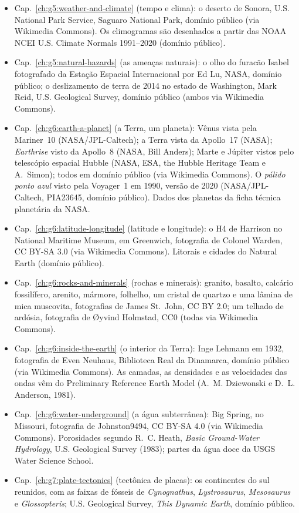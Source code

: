 \begin{itemize}
  \item Cap.~\ref{ch:g5:weather-and-climate} (tempo e clima): o deserto de Sonora, U.S. National Park Service, Saguaro National Park, domínio público (via Wikimedia Commons). Os climogramas são desenhados a partir das NOAA NCEI U.S. Climate Normals 1991--2020 (domínio público).
  \item Cap.~\ref{ch:g5:natural-hazards} (as ameaças naturais): o olho do furacão Isabel fotografado da Estação Espacial Internacional por Ed Lu, NASA, domínio público; o deslizamento de terra de 2014 no estado de Washington, Mark Reid, U.S. Geological Survey, domínio público (ambos via Wikimedia Commons).
  \item Cap.~\ref{ch:g6:earth-a-planet} (a Terra, um planeta): Vênus vista pela Mariner~10 (NASA/JPL-Caltech); a Terra vista da Apollo~17 (NASA); \emph{Earthrise} visto da Apollo~8 (NASA, Bill Anders); Marte e Júpiter vistos pelo telescópio espacial Hubble (NASA, ESA, the Hubble Heritage Team e A.~Simon); todos em domínio público (via Wikimedia Commons). O \emph{pálido ponto azul} visto pela Voyager~1 em 1990, versão de 2020 (NASA/JPL-Caltech, PIA23645, domínio público). Dados dos planetas da ficha técnica planetária da NASA.
  \item Cap.~\ref{ch:g6:latitude-longitude} (latitude e longitude): o H4 de Harrison no National Maritime Museum, em Greenwich, fotografia de Colonel Warden, CC BY-SA 3.0 (via Wikimedia Commons). Litorais e cidades do Natural Earth (domínio público).
  \item Cap.~\ref{ch:g6:rocks-and-minerals} (rochas e minerais): granito, basalto, calcário fossilífero, arenito, mármore, folhelho, um cristal de quartzo e uma lâmina de mica muscovita, fotografias de James St.~John, CC BY 2.0; um telhado de ardósia, fotografia de Øyvind Holmstad, CC0 (todas via Wikimedia Commons).
  \item Cap.~\ref{ch:g6:inside-the-earth} (o interior da Terra): Inge Lehmann em 1932, fotografia de Even Neuhaus, Biblioteca Real da Dinamarca, domínio público (via Wikimedia Commons). As camadas, as densidades e as velocidades das ondas vêm do Preliminary Reference Earth Model (A.~M. Dziewonski e D.~L. Anderson, 1981).
  \item Cap.~\ref{ch:g6:water-underground} (a água subterrânea): Big Spring, no Missouri, fotografia de Johnston9494, CC BY-SA 4.0 (via Wikimedia Commons). Porosidades segundo R.~C. Heath, \emph{Basic Ground-Water Hydrology}, U.S. Geological Survey (1983); partes da água doce da USGS Water Science School.
  \item Cap.~\ref{ch:g7:plate-tectonics} (tectônica de placas): os continentes do sul reunidos, com as faixas de fósseis de \emph{Cynognathus}, \emph{Lystrosaurus}, \emph{Mesosaurus} e \emph{Glossopteris}; U.S. Geological Survey, \emph{This Dynamic Earth}, domínio público.

\end{itemize}

